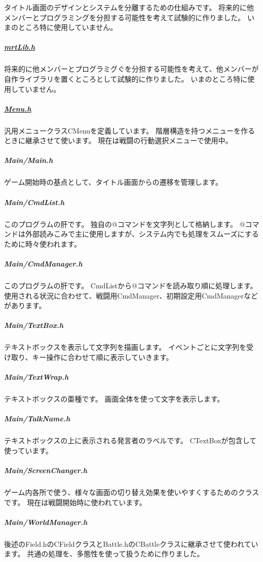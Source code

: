 タイトル画面のデザインとシステムを分離するための仕組みです。 将来的に他メンバーとプログラミングを分担する可能性を考えて試験的に作りました。 いまのところ特に使用していません。

\subparagraph*{\hyperlink{mrt_lib_8h_source}{mrt\+Lib.\+h}}

将来的に他メンバーとプログラミグぐを分担する可能性を考えて、他メンバーが自作ライブラリを置くところとして試験的に作りました。 いまのところ特に使用していません。

\subparagraph*{\hyperlink{_menu_8h_source}{Menu.\+h}}

汎用メニュークラス\+C\+Menuを定義しています。 階層構造を持つメニューを作るときに継承させて使います。 現在は戦闘の行動選択メニューで使用中。 



\subparagraph*{Main/\+Main.\+h}

ゲーム開始時の基点として、タイトル画面からの遷移を管理します。

\subparagraph*{Main/\+Cmd\+List.\+h}

このプログラムの肝です。 独自の@コマンドを文字列として格納します。 @コマンドは外部読みこみで主に使用しますが、システム内でも処理をスムーズにするために時々使われます。

\subparagraph*{Main/\+Cmd\+Manager.\+h}

このプログラムの肝です。 Cmd\+Listから@コマンドを読み取り順に処理します。 使用される状況に合わせて、戦闘用\+Cmd\+Manager、初期設定用\+Cmd\+Managerなどがあります。

\subparagraph*{Main/\+Text\+Box.\+h}

テキストボックスを表示して文字列を描画します。 イベントごとに文字列を受け取り、キー操作に合わせて順に表示していきます。

\subparagraph*{Main/\+Text\+Wrap.\+h}

テキストボックスの亜種です。 画面全体を使って文字を表示します。

\subparagraph*{Main/\+Talk\+Name.\+h}

テキストボックスの上に表示される発言者のラベルです。 C\+Text\+Boxが包含して使っています。

\subparagraph*{Main/\+Screen\+Changer.\+h}

ゲーム内各所で使う、様々な画面の切り替え効果を使いやすくするためのクラスです。 現在は戦闘開始時に使われています。

\subparagraph*{Main/\+World\+Manager.\+h}

後述の\+Field.\+hの\+C\+Fieldクラスと\+Battle.\+hの\+C\+Battleクラスに継承させて使われています。 共通の処理を、多態性を使って扱うために作りました。 




